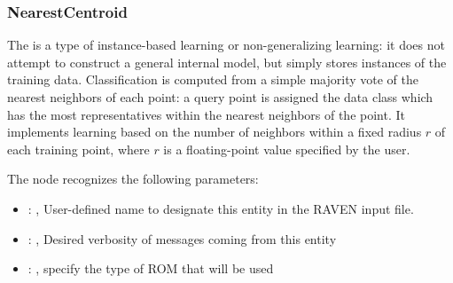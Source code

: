 \subsubsection{NearestCentroid}
  The  is a type of instance-based learning or
  non-generalizing learning: it does not attempt to construct a general internal
  model, but simply stores instances of the training data.                          Classification
  is computed from a simple majority vote of the nearest neighbors                          of each
  point: a query point is assigned the data class which has the most
  representatives within the nearest neighbors of the point.                          It implements
  learning based on the number of neighbors within a fixed radius                          $r$ of
  each training point, where $r$ is a floating-point value specified by the
  user.                          

  The  node recognizes the following parameters:
    \begin{itemize}
      \item {}: , 
        User-defined name to designate this entity in the RAVEN input file.
      \item {}: , 
        Desired verbosity of messages coming from this entity
      \item {}: , 
        specify the type of ROM that will be used
  \end{itemize}

